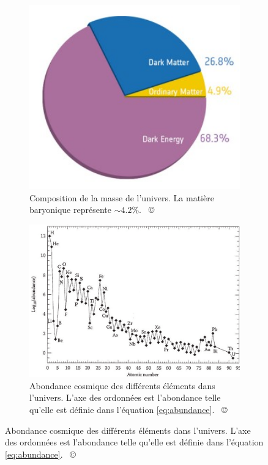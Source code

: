 \documentclass[12pt, a4paper]{article}
\newcommand{\customcite}[1]{\mbox{
  {\small \copyright} \cite{#1}}
}
\begin{document}
\begin{figure}
  \centering
     \begin{subfigure}[t]{0.45\textwidth}
         \centering
         \includegraphics[width=1.2\textwidth]{assets/planck_cosmic_chart.jpg}
         \caption{Composition de la masse de l'univers. La matière baryonique représente $\sim 4.2\%$. \customcite{cosmological_composition}}
         \label{fig:cosmological_composition}
     \end{subfigure}
     \hfill
     \begin{subfigure}[t]{0.45\textwidth}
         \centering
         \includegraphics[width=\textwidth]{assets/Plot-showing-the-average-cosmic-abundance-of-elements-as-a-function-of-their-atomic.png}
         \caption{Abondance cosmique des différents éléments dans l'univers. L'axe des ordonnées est l'abondance telle qu'elle est définie dans l'équation \ref{eq:abundance}. \customcite{cosmic_abundance}}
         \label{fig:heavy_elements}
     \end{subfigure}
\end{figure}
\end{document}
